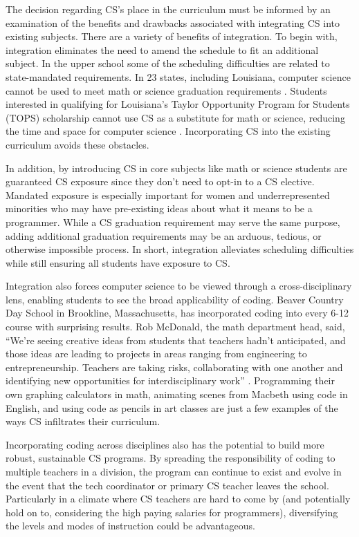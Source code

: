 The decision regarding CS's place in the curriculum must be informed by an examination of the benefits and drawbacks associated with integrating CS into existing subjects. There are a variety of benefits of integration. To begin with, integration eliminates the need to amend the schedule to fit an additional subject. In the upper school some of the scheduling difficulties are related to state-mandated requirements. In 23 states, including Louisiana, computer science cannot be used to meet math or science graduation requirements \cite{WSJref}. Students interested in qualifying for Louisiana's Taylor Opportunity Program for Students (TOPS) scholarship cannot use CS as a substitute for math or science, reducing the time and space for computer science \cite{tops}. Incorporating CS into the existing curriculum avoids these obstacles.\par
In addition, by introducing CS in core subjects like math or science students are guaranteed CS exposure since they don't need to opt-in to a CS elective. Mandated exposure is especially important for women and underrepresented minorities who may have pre-existing ideas about what it means to be a programmer. While a CS graduation requirement may serve the same purpose, adding additional graduation requirements may be an arduous, tedious, or otherwise impossible process. In short, integration alleviates scheduling difficulties while still ensuring all students have exposure to CS. \par
Integration also forces computer science to be viewed through a cross-disciplinary lens, enabling students to see the broad applicability of coding. Beaver Country Day School in Brookline, Massachusetts, has incorporated coding into every 6-12 course with surprising results. Rob McDonald, the math department head, said, ``We're seeing creative ideas from students that teachers hadn't anticipated, and those ideas are leading to projects in areas ranging from engineering to entrepreneurship. Teachers are taking risks, collaborating with one another and identifying new opportunities for interdisciplinary work'' \cite{techtimes}. Programming their own graphing calculators in math, animating scenes from Macbeth using code in English, and using code as pencils in art classes are just a few examples of the ways CS infiltrates their curriculum. \par
Incorporating coding across disciplines also has the potential to build more robust, sustainable CS programs. By spreading the responsibility of coding to multiple teachers in a division, the program can continue to exist and evolve in the event that the tech coordinator or primary CS teacher leaves the school. Particularly in a climate where CS teachers are hard to come by (and potentially hold on to, considering the high paying salaries for programmers), diversifying the levels and modes of instruction could be advantageous.\par
